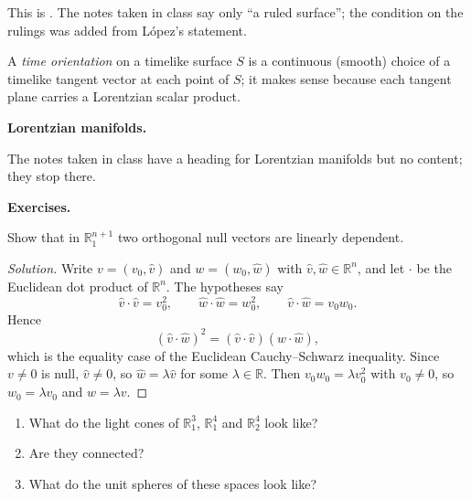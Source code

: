 This is \cite[Theorem
3.3]{lopez2014differential}. The notes
taken in class say only ``a ruled
surface''; the condition on the rulings
was added from López's statement.

\begin{definition}
\label{definition-palmas-time-orientation}
A \emph{time orientation} on a timelike
surface $S$ is a continuous (smooth) choice
of a timelike tangent vector at each point
of $S$; it makes sense because each
tangent plane carries a Lorentzian scalar
product.
\end{definition}

\medskip\noindent
{\bf Lorentzian manifolds.}

The notes taken in class have a heading
for Lorentzian manifolds but no content;
they stop there.

\medskip\noindent
{\bf Exercises.}

\begin{exercise}
\label{exercise-palmas-orthogonal-null}
Show that in $\mathbb{R}^{n+1}_1$ two
orthogonal null vectors are linearly
dependent.
\end{exercise}

\begin{proof}[Solution]
Write $v=(v_0,\hat v)$ and $w=(w_0,\hat w)$
with $\hat v,\hat w\in\mathbb{R}^n$, and
let $\cdot$ be the Euclidean dot product
of $\mathbb{R}^n$. The hypotheses say
$$
\hat v\cdot\hat v=v_0^2,\qquad
\hat w\cdot\hat w=w_0^2,\qquad
\hat v\cdot\hat w=v_0w_0.
$$
Hence
$$
(\hat v\cdot\hat w)^2
=(\hat v\cdot\hat v)(\hat w\cdot\hat w),
$$
which is the equality case of the
Euclidean Cauchy--Schwarz inequality. Since
$v\neq 0$ is null, $\hat v\neq 0$, so
$\hat w=\lambda\hat v$ for some
$\lambda\in\mathbb{R}$. Then
$v_0w_0=\lambda v_0^2$ with $v_0\neq 0$,
so $w_0=\lambda v_0$ and $w=\lambda v$.
\end{proof}

\begin{exercise}
\label{exercise-palmas-light-cones}
\begin{enumerate}
\item What do the light cones of
$\mathbb{R}^3_1$, $\mathbb{R}^4_1$ and
$\mathbb{R}^4_2$ look like?
\item Are they connected?
\item What do the unit spheres of these
spaces look like?
\end{enumerate}
\end{exercise}

